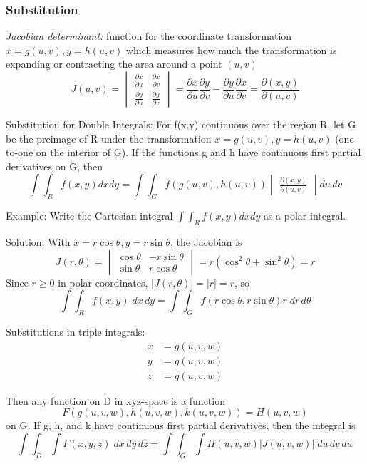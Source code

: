 \documentclass[12pt]{article}
\begin{document}
\subsubsection{Substitution}
\emph{Jacobian determinant:} function for the coordinate transformation $x= g(u,v), y=h(u,v)$ which measures how much the transformation is expanding or contracting the area around a point $(u,v)$
\[J(u,v) = \begin{vmatrix}
    \frac{\partial x}{\partial u} & \frac{\partial x}{\partial v}\\
    \frac{\partial y}{\partial u} & \frac{\partial y}{\partial v}
\end{vmatrix} = \frac{\partial x}{\partial u} \frac{\partial y}{\partial v} - \frac{\partial y}{\partial u} \frac{\partial x}{\partial v} = \frac{\partial (x,y)}{\partial (u,v)}\]

Substitution for Double Integrals:
For f(x,y) continuous over the region R, let G be the preimage of R under the transformation $x=g(u,v), y=h(u,v)$ (one-to-one on the interior of G). If the functions g and h have continuous first partial derivatives on G, then
\[\int \int_R f(x,y) dx dy = \int \int_G f(g(u,v), h(u,v)) \begin{vmatrix}
    \frac{\partial (x,y)}{\partial(u,v)}
\end{vmatrix} du\, dv\]

Example: Write the Cartesian integral $\int \int_R f(x,y) dx dy$ as a polar integral. 

Solution:
With $x=r\cos \theta, y=r\sin \theta$, the Jacobian is 
\[J(r, \theta) = \begin{vmatrix}
\cos \theta & -r\sin \theta\\
\sin \theta & r\cos \theta
\end{vmatrix} = r(\cos^2 \theta + \sin^2 \theta) = r\]
Since $r \geq 0$ in polar coordinates, $|J(r, \theta)| = |r| = r$, so 
\[\int \int_R f(x,y) \; dx\, dy = \int \int_G f(r\cos\theta, r\sin \theta) r \; dr \, d\theta\] 

Substitutions in triple integrals:
\begin{align*}
    x &= g(u,v,w)\\
    y &= g(u,v,w)\\
    z &= g(u,v,w)
\end{align*}

Then any function on D in xyz-space is a function 
\[F(g(u,v,w), h(u,v,w), k(u,v,w)) = H(u, v, w)\]
on G. If g, h, and k have continuous first partial derivatives, then the integral is 
\[\int \int_D \int F(x,y,z) \; dx \, dy \, dz = \int \int_G \int H(u, v, w) |J(u, v, w)| \; du\, dv\, dw\]
\pagebreak
\end{document}
